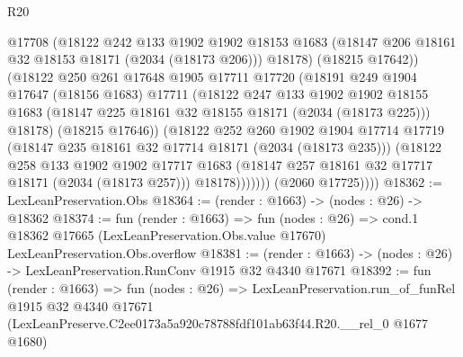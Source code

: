 \begin{lexlean}{R20}
\begin{coremodule}
                    @17708
                    (@18122
                      @242
                      @133
                      @1902
                      @1902
                      @18153
                      @1683
                      (@18147 @206 @18161 @32 @18153 @18171 (@2034 (@18173 @206)))
                      @18178)
                    (@18215 @17642))
                  (@18122
                    @250
                    @261
                    @17648
                    @1905
                    @17711
                    @17720
                    (@18191
                      @249
                      @1904
                      @17647
                      (@18156 @1683)
                      @17711
                      (@18122
                        @247
                        @133
                        @1902
                        @1902
                        @18155
                        @1683
                        (@18147 @225 @18161 @32 @18155 @18171 (@2034 (@18173 @225)))
                        @18178)
                      (@18215 @17646))
                    (@18122
                      @252
                      @260
                      @1902
                      @1904
                      @17714
                      @17719
                      (@18147 @235 @18161 @32 @17714 @18171 (@2034 (@18173 @235)))
                      (@18122
                        @258
                        @133
                        @1902
                        @1902
                        @17717
                        @1683
                        (@18147 @257 @18161 @32 @17717 @18171 (@2034 (@18173 @257)))
                        @18178)))))))
          (@2060 @17725))))
@18362 := LexLeanPreservation.Obs
@18364 := (render : @1663) -> (nodes : @26) -> @18362
@18374 := fun (render : @1663) =>
  fun (nodes : @26) =>
  cond.{1} @18362 @17665 (LexLeanPreservation.Obs.value @17670) LexLeanPreservation.Obs.overflow
@18381 := (render : @1663) -> (nodes : @26) -> LexLeanPreservation.RunConv @1915 @32 @4340 @17671
@18392 := fun (render : @1663) =>
  fun (nodes : @26) =>
  LexLeanPreservation.run_of_funRel
    @1915
    @32
    @4340
    @17671
    (LexLeanPreserve.C2ee0173a5a920c78788fdf101ab63f44.R20.__rel_0 @1677 @1680)
\end{coremodule}
\end{lexlean}
